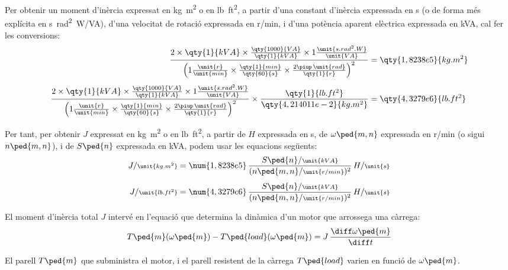 Per  obtenir un moment d'inèrcia expressat en \unit{kg.m^2} o en \unit{lb.ft^2}, a partir d'una constant d'inèrcia  expressada en \unit{s} (o de forma més explícita en \unit{s.rad^2.W/VA}), d'una velocitat de rotació expressada en \unit{r/min}, i d'una potència aparent elèctrica expressada en \unit{kVA}, cal  fer les conversions:
\begin{subequations}
\begin{align}
    \frac{2\times \qty{1}{kVA} \times \frac{\qty{1000}{VA}}{\qty{1}{kVA}} \times 1 \frac{\unit{s.rad^2.W}}{\unit{VA}}}{\left(1\frac{\unit{r}}{\unit{min}} \times \frac{\qty{1}{min}}{\qty{60}{s}} \times \frac{2\piup\,\unit{rad}}{\qty{1}{r}}\right)^2}  &= \qty{1,8238e5}{kg.m^2} \\[1ex]
    \frac{2\times \qty{1}{kVA} \times \frac{\qty{1000}{VA}}{\qty{1}{kVA}} \times 1 \frac{\unit{s.rad^2.W}}{\unit{VA}}}{\left(1\frac{\unit{r}}{\unit{min}} \times \frac{\qty{1}{min}}{\qty{60}{s}} \times \frac{2\piup\,\unit{rad}}{\qty{1}{r}}\right)^2}  \times \frac{\qty{1}{lb.ft^2}}{\qty{4,214011e-2}{kg.m^2}} &= \qty{4,3279e6}{lb.ft^2}
\end{align}
\end{subequations}

Per tant, per  obtenir $J$  expressat en \unit{kg.m^2} o en \unit{lb.ft^2}, a partir de $H$ expressada en \unit{s}, de $\omega\ped{m,n}$ expressada en \unit{r/min} (o sigui $n\ped{m,n}$), i de $S\ped{n}$ expressada en \unit{kVA}, podem usar les equacions següents:
\begin{subequations}
\begin{align}
     J/{\scriptstyle \unit{kg.m^2}} &= \num{1,8238e5}\,  \frac{S\ped{n}/{\scriptstyle \unit{kVA}}}{(n\ped{m,n}/{\scriptstyle \unit{r/min}})^2} \, H/{\scriptstyle \unit{s}}\\[1ex]
    J/{\scriptstyle \unit{lb.ft^2}} &= \num{4,3279e6}\,  \frac{S\ped{n}/{\scriptstyle \unit{kVA}}}{(n\ped{m,n}/{\scriptstyle \unit{r/min}})^2} \, H/{\scriptstyle \unit{s}}
\end{align}
\end{subequations}

El moment d'inèrcia total $J$ intervé en l'equació que  determina la dinàmica d'un motor que arrossega una càrrega:
\begin{equation}\label{eq:Tm-Tl-vel}
    T\ped{m}(\omega\ped{m}) - T\ped{load}(\omega\ped{m}) = J\,\frac{\diff \omega\ped{m}}{\diff t}
\end{equation}

El parell $T\ped{m}$ que subministra el motor, i el parell resistent de la càrrega $T\ped{load}$ varien en funció de $\omega\ped{m}$.

